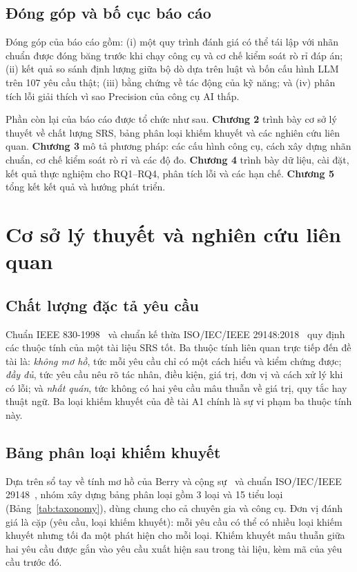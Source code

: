 \documentclass[12pt,a4paper]{report}
\begin{document}
\section{Đóng góp và bố cục báo cáo}
Đóng góp của báo cáo gồm: (i) một quy trình đánh giá có thể tái lập với nhãn chuẩn được đóng băng trước khi chạy công cụ và cơ chế kiểm soát rò rỉ đáp án; (ii) kết quả so sánh định lượng giữa bộ dò dựa trên luật và bốn cấu hình LLM trên 107 yêu cầu thật; (iii) bằng chứng về tác động của kỹ năng; và (iv) phân tích lỗi giải thích vì sao Precision của công cụ AI thấp.

Phần còn lại của báo cáo được tổ chức như sau. \textbf{Chương 2} trình bày cơ sở lý thuyết về chất lượng SRS, bảng phân loại khiếm khuyết và các nghiên cứu liên quan. \textbf{Chương 3} mô tả phương pháp: các cấu hình công cụ, cách xây dựng nhãn chuẩn, cơ chế kiểm soát rò rỉ và các độ đo. \textbf{Chương 4} trình bày dữ liệu, cài đặt, kết quả thực nghiệm cho RQ1--RQ4, phân tích lỗi và các hạn chế. \textbf{Chương 5} tổng kết kết quả và hướng phát triển.

\chapter{Cơ sở lý thuyết và nghiên cứu liên quan}

\section{Chất lượng đặc tả yêu cầu}
Chuẩn IEEE 830-1998~\cite{ieee830} và chuẩn kế thừa ISO/IEC/IEEE 29148:2018~\cite{iso29148} quy định các thuộc tính của một tài liệu SRS tốt. Ba thuộc tính liên quan trực tiếp đến đề tài là: \textit{không mơ hồ}, tức mỗi yêu cầu chỉ có một cách hiểu và kiểm chứng được; \textit{đầy đủ}, tức yêu cầu nêu rõ tác nhân, điều kiện, giá trị, đơn vị và cách xử lý khi có lỗi; và \textit{nhất quán}, tức không có hai yêu cầu mâu thuẫn về giá trị, quy tắc hay thuật ngữ. Ba loại khiếm khuyết của đề tài A1 chính là sự vi phạm ba thuộc tính này.

\section{Bảng phân loại khiếm khuyết}
Dựa trên sổ tay về tính mơ hồ của Berry và cộng sự~\cite{berry2003} và chuẩn ISO/IEC/IEEE 29148~\cite{iso29148}, nhóm xây dựng bảng phân loại gồm 3 loại và 15 tiểu loại (Bảng~\ref{tab:taxonomy}), dùng chung cho cả chuyên gia và công cụ. Đơn vị đánh giá là cặp (yêu cầu, loại khiếm khuyết): mỗi yêu cầu có thể có nhiều loại khiếm khuyết nhưng tối đa một phát hiện cho mỗi loại. Khiếm khuyết mâu thuẫn giữa hai yêu cầu được gắn vào yêu cầu xuất hiện sau trong tài liệu, kèm mã của yêu cầu trước đó.
\end{document}

